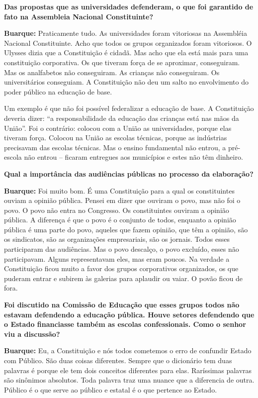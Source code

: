 \textbf{Das propostas que as universidades defenderam, o que foi
garantido de fato na Assembleia Nacional Constituinte?}

\textbf{Buarque:} Praticamente tudo. As universidades foram vitoriosas
na Assembléia Nacional Constituinte. Acho que todos os grupos
organizados foram vitoriosos. O Ulysses dizia que a Constituição é
cidadã. Mas acho que ela está mais para uma constituição corporativa. Os
que tiveram força de se aproximar, conseguiram. Mas os analfabetos não
conseguiram. As crianças não conseguiram. Os universitários conseguiam.
A Constituição não deu um salto no envolvimento do poder público na
educação de base.

Um exemplo é que não foi possível federalizar a educação de base. A
Constituição deveria dizer: ``a responsabilidade da educação das
crianças está nas mãos da União''. Foi o contrário: colocou com a União
as universidades, porque elas tiveram força. Colocou na União as escolas
técnicas, porque as indústrias precisavam das escolas técnicas. Mas o
ensino fundamental não entrou, a pré-escola não entrou -- ficaram
entregues aos municípios e estes não têm dinheiro.

\textbf{Qual a importância das audiências públicas no processo da
elaboração?}

\textbf{Buarque:} Foi muito bom. É uma Constituição para a qual os
constituintes ouviam a opinião pública. Pensei em dizer que ouviram o
povo, mas não foi o povo. O povo não entra no Congresso. Os
constituintes ouviram a opinião pública. A diferença é que o povo é o
conjunto de todos, enquanto a opinião pública é uma parte do povo,
aqueles que fazem opinião, que têm a opinião, são os sindicatos, são as
organizações empresariais, são os jornais. Todos esses participaram das
audiências. Mas o povo descalço, o povo excluído, esses não
participavam. Alguns representavam eles, mas eram poucos. Na verdade a
Constituição ficou muito a favor dos grupos corporativos organizados, os
que puderam entrar e subirem às galerias para aplaudir ou vaiar. O povão
ficou de fora.

\textbf{Foi discutido na Comissão de Educação que esses grupos todos não
estavam defendendo a educação pública. Houve setores defendendo que o
Estado financiasse também as escolas confessionais. Como o senhor viu a
discussão?}

\textbf{Buarque:} Eu, a Constituição e nós todos cometemos o erro de
confundir Estado com Público. São duas coisas diferentes. Sempre que o
dicionário tem duas palavras é porque ele tem dois conceitos diferentes
para elas. Raríssimas palavras são sinônimos absolutos. Toda palavra
traz uma nuance que a diferencia de outra. Público é o que serve ao
público e estatal é o que pertence ao Estado.

